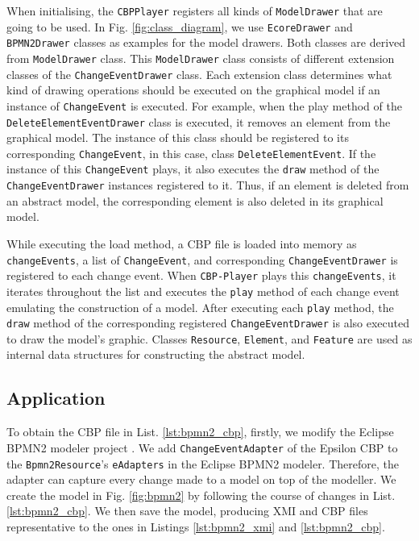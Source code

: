 \documentclass[conference]{IEEEtran}
\begin{document}
When initialising, the \texttt{CBPPlayer} registers all kinds of \texttt{ModelDrawer} that are going to be used. 
In Fig. \ref{fig:class_diagram}, we use \texttt{EcoreDrawer} and \texttt{BPMN2Drawer} classes as examples for the model drawers. 
Both classes are derived from \texttt{ModelDrawer} class. This \texttt{ModelDrawer} class consists of 
different extension classes of the \texttt{ChangeEventDrawer} class. Each extension class determines
what kind of drawing operations should be executed on the graphical model if an instance of \texttt{ChangeEvent} is executed.
For example, when the play method of the \texttt{DeleteElementEventDrawer} class is executed,
it removes an element from the graphical model. The instance of this class should be registered to
its corresponding \texttt{ChangeEvent}, in this case, class \texttt{DeleteElementEvent}. 
If the instance of this \texttt{ChangeEvent} plays, it also executes the \texttt{draw} method of 
the \texttt{ChangeEventDrawer} instances registered to it. Thus, if an element is deleted from an abstract model,
the corresponding element is also deleted in its graphical model. 

While executing the load method, a CBP file is loaded into memory as \texttt{changeEvents}, 
a list of \texttt{ChangeEvent}, and corresponding \texttt{ChangeEventDrawer} is registered to each change event. 
When \texttt{CBP-Player} plays this \texttt{changeEvents}, it iterates throughout the list and executes  
the \texttt{play} method of each change event emulating the construction of a model. 
After executing each \texttt{play} method, the \texttt{draw} method of 
the corresponding registered \texttt{ChangeEventDrawer} is also executed to draw the model's graphic.
Classes \texttt{Resource}, \texttt{Element}, and \texttt{Feature} are used as internal data structures 
for constructing the abstract model.

\subsection{Application}
\label{sec:application}
To obtain the CBP file in List. \ref{lst:bpmn2_cbp}, firstly, we modify
the Eclipse BPMN2 modeler project \cite{eclipse2019bpmn2}. We add \texttt{ChangeEventAdapter} \cite{epsilonlabs2019changeeventadapter}
of the Epsilon CBP \cite{DBLP:conf/models/YohannisKP17}  to the \texttt{Bpmn2Resource}'s \texttt{eAdapters}
in the Eclipse BPMN2 modeler. Therefore, the adapter can capture every change made to a model on top of the modeller.
We create the model in Fig. \ref{fig:bpmn2} by following the course of changes in List. \ref{lst:bpmn2_cbp}.
We then save the model, producing XMI and CBP files representative to the ones 
in Listings \ref{lst:bpmn2_xmi} and \ref{lst:bpmn2_cbp}. 
 
\end{document}
